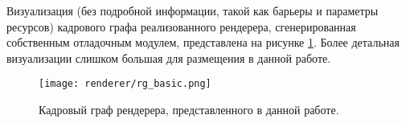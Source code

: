 Визуализация (без подробной информации, такой как барьеры и параметры ресурсов) кадрового графа реализованного рендерера, сгенерированная собственным отладочным модулем, представлена на рисунке \ref{fig:res_rg_basic}. Более детальная визуализации слишком большая для размещения в данной работе.

\begin{figure}[h]
    \centering
    \texttt{[image: renderer/rg\_basic.png]}
    \caption{Кадровый граф рендерера, представленного в данной работе.}
    \label{fig:res_rg_basic}
\end{figure}
